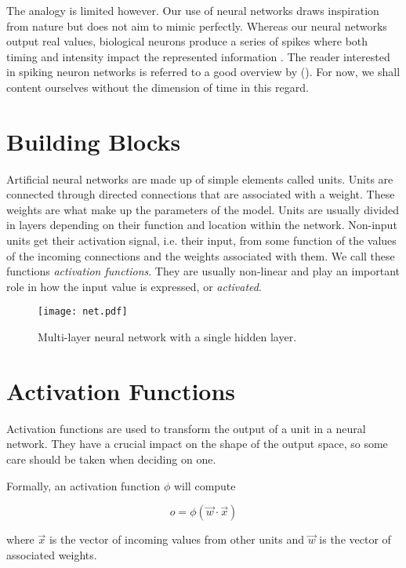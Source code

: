 The analogy is limited however.
Our use of neural networks draws inspiration from nature
but does not aim to mimic perfectly.
Whereas our neural networks output real values,
biological neurons produce a series of spikes
where both timing and intensity impact the represented information
\parencite{bialek1991reading}.
The reader interested in spiking neuron networks
is referred to a good overview by
\citeauthor{paugam2012computing} (\citeyear{paugam2012computing}).
For now,
we shall content ourselves without the dimension of time in this regard.

\section{Building Blocks}
Artificial neural networks are made up of simple elements called units.
Units are connected through directed connections
that are associated with a weight.
These weights are what make up the parameters of the model.
Units are usually divided in layers depending on their function
and location within the network.
Non-input units get their activation signal, i.e. their input,
from some function of the values of the incoming connections
and the weights associated with them.
We call these functions \textit{activation functions}.
They are usually non-linear and play an important role
in how the input value is expressed, or \textit{activated}.

\begin{figure}[h]
\label{fig.neuralnet}
\center
\texttt{[image: net.pdf]}
\caption[Multi-layer neural network]{
  Multi-layer neural network with a single hidden layer.
}
\end{figure}

\section{Activation Functions}
\label{sec:activation}

Activation functions are used to transform the output
of a unit in a neural network.
They have a crucial impact on the shape of the output space,
so some care should be taken when deciding on one.

Formally, an activation function $\phi$ will compute

\begin{equation}
  o = \phi (\overrightarrow{w} \cdot \overrightarrow{x})
\end{equation}

where $\overrightarrow{x}$
is the vector of incoming values from other units
and $\overrightarrow{w}$
is the vector of associated weights.

